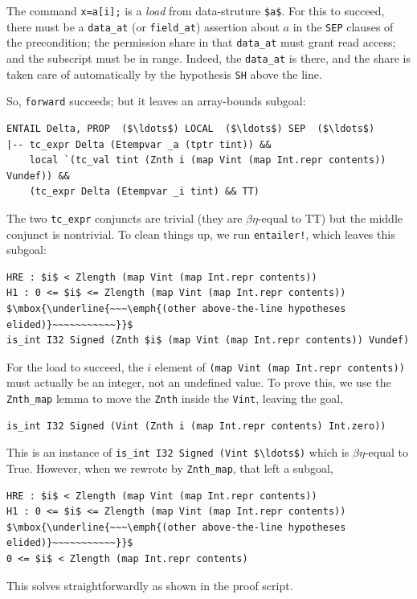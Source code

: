\documentclass[12pt,fleqn,openany,oneside,showtrims]{memoir}
\begin{document}
The command \lstinline{x=a[i];}
is a \emph{load} from data-struture \lstinline{$a$}.
For this to succeed, there must be a \lstinline{data_at}
(or \lstinline{field_at}) assertion about $a$ in the \lstinline{SEP}
clauses of the precondition; the permission share in that 
\lstinline{data_at} must grant read access; and
the subscript must be in range.
Indeed, the \lstinline{data_at} is there, and
the share is taken care of automatically
by the hypothesis \lstinline{SH} above the line.

So, \lstinline{forward} succeeds; but it leaves an array-bounds subgoal:

\begin{lstlisting}
ENTAIL Delta, PROP  ($\ldots$) LOCAL  ($\ldots$) SEP  ($\ldots$)
|-- tc_expr Delta (Etempvar _a (tptr tint)) &&
    local `(tc_val tint (Znth i (map Vint (map Int.repr contents)) Vundef)) &&
    (tc_expr Delta (Etempvar _i tint) && TT)
\end{lstlisting}
The two \lstinline{tc_expr} conjuncts are trivial
(they are $\beta\eta$-equal to TT)
but the middle conjunct is nontrivial.  To clean things up,
we run \lstinline{entailer!}, which leaves this subgoal:

\begin{lstlisting}
HRE : $i$ < Zlength (map Vint (map Int.repr contents))
H1 : 0 <= $i$ <= Zlength (map Vint (map Int.repr contents))
$\mbox{\underline{~~~\emph{(other above-the-line hypotheses elided)}~~~~~~~~~~~}}$
is_int I32 Signed (Znth $i$ (map Vint (map Int.repr contents)) Vundef)
\end{lstlisting}
For the load to succeed, the $i$ element of
\lstinline{(map Vint (map Int.repr contents))}
must actually be an integer, not an undefined value.
To prove this, we use the \lstinline{Znth_map} lemma\label{refcard:rewrite-znth-map}
to move the \lstinline{Znth} inside the \lstinline{Vint},
leaving the goal,
\begin{lstlisting}
is_int I32 Signed (Vint (Znth i (map Int.repr contents) Int.zero))
\end{lstlisting}
This is an instance of
\lstinline{is_int I32 Signed (Vint $\ldots$)}
which is $\beta\eta$-equal to True.
However, when we rewrote by \lstinline{Znth_map}, that left a subgoal,
\begin{lstlisting}
HRE : $i$ < Zlength (map Vint (map Int.repr contents))
H1 : 0 <= $i$ <= Zlength (map Vint (map Int.repr contents))
$\mbox{\underline{~~~\emph{(other above-the-line hypotheses elided)}~~~~~~~~~~~}}$
0 <= $i$ < Zlength (map Int.repr contents)
\end{lstlisting}
This solves straightforwardly as shown in the proof script.
\end{document}
